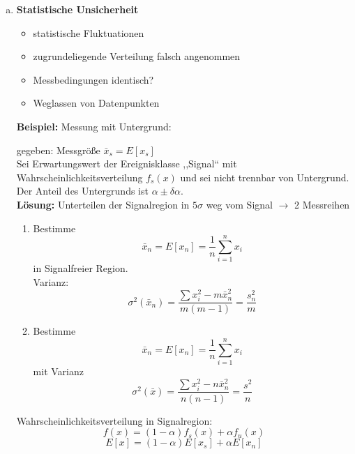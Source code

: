 \begin{enumerate}[a)]
	\item \textbf{Statistische Unsicherheit}
	\begin{itemize}
		\item statistische Fluktuationen
		\item zugrundeliegende Verteilung falsch angenommen
		\item Messbedingungen identisch?
		\item Weglassen von Datenpunkten
	\end{itemize}
	\textbf{Beispiel:} Messung mit Untergrund:
	
	\hft
	
	\noindent
	gegeben: Messgröße $ \bar{x}_s = E[x_s] $\\[5pt]
	Sei Erwartungswert der Ereignisklasse ,,Signal`` mit Wahrscheinlichkeitsverteilung $ f_s(x) $ und sei nicht trennbar von Untergrund. Der Anteil des Untergrunds ist $ \alpha \pm \delta \alpha $.\\[10pt]
	\textbf{Lösung:} Unterteilen der Signalregion in $ 5 \sigma $ weg vom Signal $ \to $ 2 Messreihen
	\begin{enumerate}[1.)]
		\item Bestimme
		\begin{equation*}
		\bar{x}_n = E[x_n] = \frac{1}{n} \sum_{i=1}^{n} x_i
		\end{equation*}
		in Signalfreier Region.\\
		Varianz:
		\begin{equation*}
		\sigma^2(\bar{x}_n) = \frac{\sum x_i^2 - m \bar{x}_n^2}{m (m - 1)} = \frac{s_n^2}{m}
		\end{equation*}
		\item Bestimme
		\begin{equation*}
		\bar{x}_n = E[x_n] = \frac{1}{n} \sum_{i=1}^{n} x_i
		\end{equation*}
		mit Varianz
		\begin{equation*}
		\sigma^2(\bar{x}) = \frac{\sum x_i^2 - n \bar{x}_n^2}{n (n - 1)} = \frac{s^2}{n}
		\end{equation*}
	\end{enumerate}
	Wahrscheinlichkeitsverteilung in Signalregion:
	\begin{equation*}
	f(x) = (1-\alpha) f_s(x) + \alpha f_u(x)
	\end{equation*}
	\begin{equation*}
	E[x] = (1-\alpha) E[x_s] + \alpha E[x_n]
	\end{equation*}
	\begin{equation*}

\end{equation*}
\end{enumerate}
